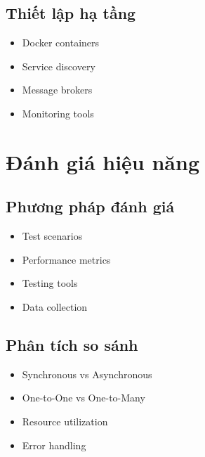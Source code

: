 \subsection{Thiết lập hạ tầng}
\begin{itemize}
    \item Docker containers
    \item Service discovery
    \item Message brokers
    \item Monitoring tools
\end{itemize}

\section{Đánh giá hiệu năng}
\subsection{Phương pháp đánh giá}
\begin{itemize}
    \item Test scenarios
    \item Performance metrics
    \item Testing tools
    \item Data collection
\end{itemize}

\subsection{Phân tích so sánh}
\begin{itemize}
    \item Synchronous vs Asynchronous
    \item One-to-One vs One-to-Many
    \item Resource utilization
    \item Error handling
\end{itemize} 